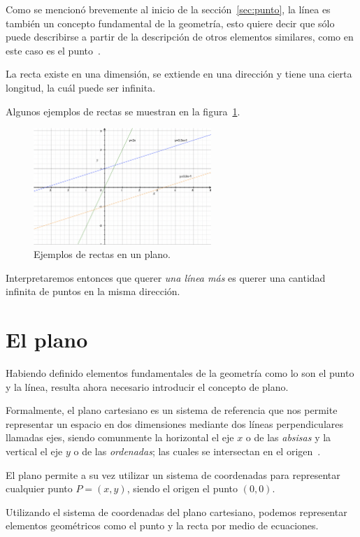 \documentclass[12pt, oneside]{article}
\begin{document}
Como se mencionó brevemente al inicio de la sección~\ref{sec:punto}, la línea es también un concepto fundamental de la geometría, esto quiere decir que sólo puede describirse a partir de la descripción de otros elementos similares, como en este caso es el punto~\cite{eswiki:recta}.

La recta existe en una dimensión, se extiende en una dirección y tiene una cierta longitud, la cuál puede ser infinita.

Algunos ejemplos de rectas se muestran en la figura~\ref{fig:grafRectas}.
\begin{figure}[h]
\centering
\includegraphics[width=0.6\textwidth]{grafRectas.png}
\caption{Ejemplos de rectas en un plano.}
\label{fig:grafRectas}
\end{figure}

Interpretaremos entonces que querer \textit{una línea más} es querer una cantidad infinita de puntos en la misma dirección.

\section{El plano}
\label{sec:plano}
Habiendo definido elementos fundamentales de la geometría como lo son el punto y la línea, resulta ahora necesario introducir el concepto de plano.

Formalmente, el plano cartesiano es un sistema de referencia que nos permite representar un espacio en dos dimensiones
mediante dos líneas perpendiculares llamadas ejes, siendo comunmente la horizontal el eje $x$ o de las \textit{absisas} y la vertical el eje $y$ o de las \textit{ordenadas}; las cuales se intersectan en el origen~\cite{eswiki:planoCartesiano}.

El plano permite a su vez utilizar un sistema de coordenadas para representar cualquier punto $P = (x, y)$, siendo el origen el punto $(0,0)$.

Utilizando el sistema de coordenadas del plano cartesiano, podemos representar elementos geométricos como el punto y la recta por medio de ecuaciones.
\end{document}
